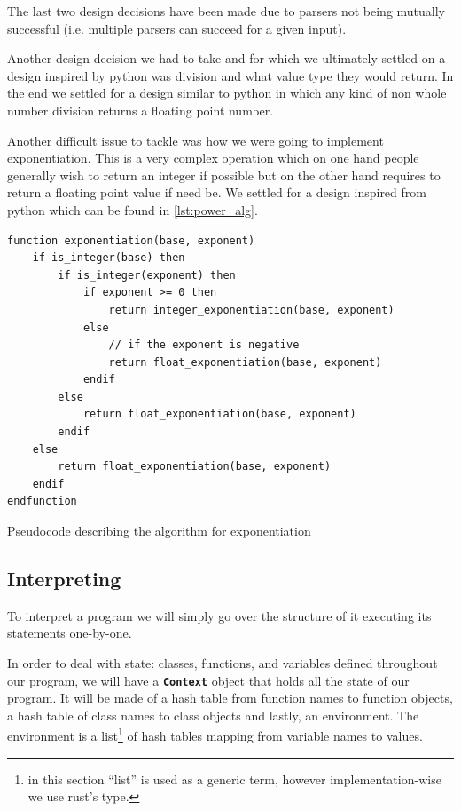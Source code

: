 \documentclass{article}
\begin{document}
The last two design decisions have been made due to parsers not being mutually
successful (i.e. multiple parsers can succeed for a given input).

Another design decision we had to take and for which we ultimately settled on a
design inspired by python was division and what value type they would return.
In the end we settled for a design similar to python in which any kind of non
whole number division returns a floating point number.

Another difficult issue to tackle was how we were going to implement
exponentiation. This is a very complex operation which on one hand people
generally wish to return an integer if possible but on the other hand requires
to return a floating point value if need be. We settled for a design inspired
from python which can be found in \autoref{lst:power_alg}.

\begin{listing}
	\begin{verbatim}
function exponentiation(base, exponent)
	if is_integer(base) then
		if is_integer(exponent) then
			if exponent >= 0 then
				return integer_exponentiation(base, exponent)
			else
				// if the exponent is negative
				return float_exponentiation(base, exponent)
			endif
		else
			return float_exponentiation(base, exponent)
		endif
	else
		return float_exponentiation(base, exponent)
	endif
endfunction
	\end{verbatim}
	\caption[Pseudocode describing the algorithm for exponentiation]{Pseudocode
	describing the algorithm for exponentiation\protect\footnotemark}
	\label{lst:power_alg}
\end{listing}


\subsection{Interpreting}

To interpret a program we will simply go over the structure of it executing its
statements one-by-one.

In order to deal with state: classes, functions, and variables defined
throughout our program, we will have a \textbf{\texttt{Context}} object that
holds all the state of our program. It will be made of a hash table from
function names to function objects, a hash table of class names to class
objects and lastly, an environment. The environment is a list\footnote{in this
section ``list'' is used as a generic term, however implementation-wise we use
rust's  type.} of hash tables mapping from variable names to
values.
\end{document}
